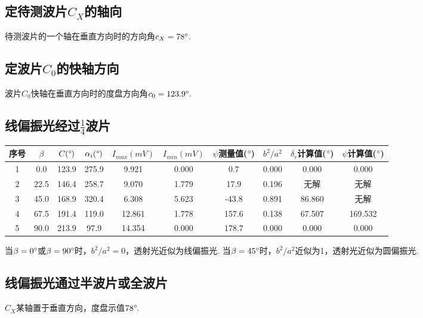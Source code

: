 \documentclass{thureport}
\def\de{{\ensuremath{^\circ\hspace{-0.09em}}}}
\begin{document}
\subsection{定待测波片$C_X$的轴向}
待测波片的一个轴在垂直方向时的方向角$c_X=78\de$.

\subsection{定波片$C_0$的快轴方向}
波片$C_0$快轴在垂直方向时的度盘方向角$c_0=123.9\de$.

\subsection{线偏振光经过$\frac{1}{4}$波片}
\begin{table}[H]
    \centering
      \begin{tabular}{|c|c|c|c|c|c|c|c|c|c|}
      \hline
      序号    & $\beta$ & $C(\de)$ & $\alpha_i(\de)$ & $I_{max}(mV)$ & $I_{min}(mV)$ & $\psi$测量值(\de) & $b^2/a^2$ & $\delta_r$计算值(\de) & $\psi$计算值(\de) \bigstrut\\
      \hline
      1     & 0.0   & 123.9  & 275.9  & 9.921  & 0.000  & 0.7   & 0.000  & 0.000  & 0.000  \bigstrut\\
      \hline
      2     & 22.5  & 146.4  & 258.7  & 9.070  & 1.779  & 17.9  & 0.196  & 无解    & 无解 \bigstrut\\
      \hline
      3     & 45.0  & 168.9  & 320.4  & 6.308  & 5.623  & -43.8  & 0.891  & 86.860  & 无解 \bigstrut\\
      \hline
      4     & 67.5  & 191.4  & 119.0  & 12.861  & 1.778  & 157.6  & 0.138  & 67.507  & 169.532  \bigstrut\\
      \hline
      5     & 90.0  & 213.9  & 97.9  & 14.354  & 0.000  & 178.7  & 0.000  & 0.000  & 0.000  \bigstrut\\
      \hline
      \end{tabular}%
  \end{table}%

当$\beta=0\de$或$\beta=90\de$时，$b^2/a^2=0$，透射光近似为线偏振光. 当$\beta=45\de$时，$b^2/a^2$近似为1，透射光近似为圆偏振光.

\subsection{线偏振光通过半波片或全波片}
$C_X$某轴置于垂直方向，度盘示值$78\de$.
\end{document}
